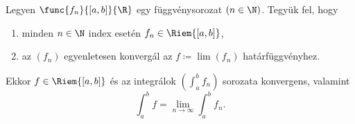 \documentclass[
]{elteikthesis}[2024/04/26]
\begin{document}
	\begin{theorem}{}{}
		Legyen \( \func{f_n}{[a, b]}{\R} \) egy függvénysorozat \( (n \in \N) \).
		Tegyük fel, hogy
		\begin{enumerate}[label=\roman*)]
			\item\label{eq:integrálható-függvénysorozat-01}
			minden \( n \in \N \) index esetén \( f_n \in \Riem{[a, b]} \),
			
			\item\label{eq:integrálható-függvénysorozat-02}
			az \( (f_n) \) egyenletesen konvergál az \( f \coloneq \lim(f_n) \) határfüggvényhez.
		\end{enumerate}
		Ekkor \( f \in \Riem{[a, b]} \) és az 
		integrálok \( \left( \int_a^b f_n \right) \) sorozata konvergens, valamint
		\[
			\int_a^b f = \lim_{n \to \infty} \int_a^b f_n.
		\]
	\end{theorem}
\end{document}
